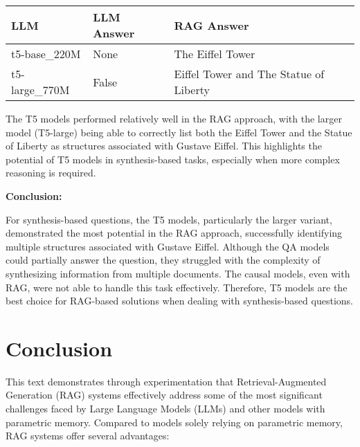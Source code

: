 \documentclass[11pt]{wseas}
\begin{document}
\begin{longtable}[]{@{}
  >{\raggedright\arraybackslash}p{}
  >{\raggedright\arraybackslash}p{}
  >{\raggedright\arraybackslash}p{}@{}}
\toprule\noalign{}
\begin{minipage}[b]{\linewidth}\raggedright
LLM
\end{minipage} & \begin{minipage}[b]{\linewidth}\raggedright
LLM Answer
\end{minipage} & \begin{minipage}[b]{\linewidth}\raggedright
RAG Answer
\end{minipage} \\
\midrule\noalign{}
\endhead
\bottomrule\noalign{}
\endlastfoot
t5-base\_220M & None & The Eiffel Tower \\
t5-large\_770M & False & Eiffel Tower and The Statue of Liberty \\
\end{longtable}

The T5 models performed relatively well in the RAG approach, with the
larger model (T5-large) being able to correctly list both the Eiffel
Tower and the Statue of Liberty as structures associated with Gustave
Eiffel. This highlights the potential of T5 models in synthesis-based
tasks, especially when more complex reasoning is required.

\textbf{Conclusion:}

For synthesis-based questions, the T5 models, particularly the larger
variant, demonstrated the most potential in the RAG approach,
successfully identifying multiple structures associated with Gustave
Eiffel. Although the QA models could partially answer the question, they
struggled with the complexity of synthesizing information from multiple
documents. The causal models, even with RAG, were not able to handle
this task effectively. Therefore, T5 models are the best choice for
RAG-based solutions when dealing with synthesis-based questions.

    \newpage

    \section{Conclusion}\label{conclusion}

This text demonstrates through experimentation that Retrieval-Augmented
Generation (RAG) systems effectively address some of the most
significant challenges faced by Large Language Models (LLMs) and other
models with parametric memory. Compared to models solely relying on
parametric memory, RAG systems offer several advantages:
\end{document}
